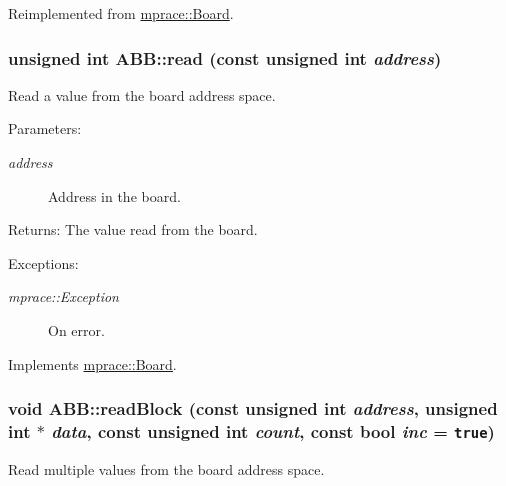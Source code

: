 Reimplemented from \hyperlink{classmprace_1_1Board_e0}{mprace::Board}.\hypertarget{classmprace_1_1ABB_a5}{
\subsubsection[read]{\setlength{\rightskip}{0pt plus 5cm}unsigned int ABB::read (const unsigned int {\em address})}}
\label{classmprace_1_1ABB_a5}


Read a value from the board address space. 

\begin{Desc}
\item[Parameters:]
\begin{description}
\item[{\em address}]Address in the board. \end{description}
\end{Desc}
\begin{Desc}
\item[Returns:]The value read from the board. \end{Desc}
\begin{Desc}
\item[Exceptions:]
\begin{description}
\item[{\em mprace::Exception}]On error.\end{description}
\end{Desc}


Implements \hyperlink{classmprace_1_1Board_a4}{mprace::Board}.\hypertarget{classmprace_1_1ABB_a7}{
\subsubsection[readBlock]{\setlength{\rightskip}{0pt plus 5cm}void ABB::read\-Block (const unsigned int {\em address}, unsigned int $\ast$ {\em data}, const unsigned int {\em count}, const bool {\em inc} = {\tt true})}}
\label{classmprace_1_1ABB_a7}


Read multiple values from the board address space. 

